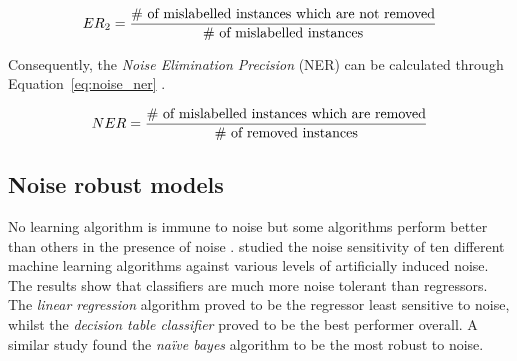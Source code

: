 \begin{equation}\label{eq:noise_type2}
	ER\textsubscript{2} = \frac{\textnormal{\# of mislabelled instances which are not removed}}{\textnormal{\# of mislabelled instances}}
\end{equation}

Consequently, the \textit{Noise Elimination Precision} (NER) can be calculated through Equation~\ref{eq:noise_ner} \citep{frenay2014classification}.

\begin{equation}\label{eq:noise_ner}
	NER = \frac{\textnormal{\# of mislabelled instances which are removed}}{\textnormal{\# of removed instances}}
\end{equation}

\subsection{Noise robust models}\label{sec:noise_robust_models}

No learning algorithm is immune to noise but some algorithms perform better than others in the presence of noise \citep{frenay2014comprehensive}.  \citet{kalapanidas2003machine} studied the noise sensitivity of ten different machine learning algorithms against various levels of artificially induced noise.  The results show that classifiers are much more noise tolerant than regressors.  The \textit{linear regression} algorithm proved to be the regressor least sensitive to noise, whilst the \textit{decision table classifier} proved to be the best performer overall.  A similar study \citep{nettleton2010study} found the \textit{na\"ive bayes} algorithm to be the most robust to noise.

